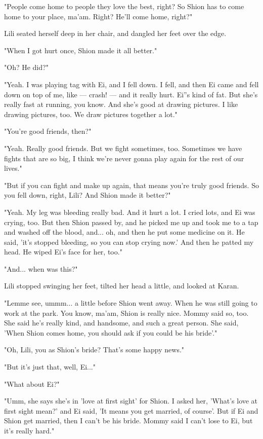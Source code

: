 "People come home to people they love the best, right? So Shion has to
come home to your place, ma'am. Right? He'll come home, right?"

Lili seated herself deep in her chair, and dangled her feet over the
edge.

"When I got hurt once, Shion made it all better."

"Oh? He did?"

"Yeah. I was playing tag with Ei, and I fell down. I fell, and then Ei
came and fell down on top of me, like --- crash! --- and it really hurt.
Ei''s kind of fat. But she's really fast at running, you know. And she's
good at drawing pictures. I like drawing pictures, too. We draw pictures
together a lot."

"You're good friends, then?"

"Yeah. Really good friends. But we fight sometimes, too. Sometimes we
have fights that are so big, I think we're never gonna play again for
the rest of our lives."

"But if you can fight and make up again, that means you're truly good
friends. So you fell down, right, Lili? And Shion made it better?"

"Yeah. My leg was bleeding really bad. And it hurt a lot. I cried lots,
and Ei was crying, too. But then Shion passed by, and he picked me up
and took me to a tap and washed off the blood, and... oh, and then he
put some medicine on it. He said, 'it's stopped bleeding, so you can
stop crying now.' And then he patted my head. He wiped Ei's face for
her, too."

"And... when was this?"

Lili stopped swinging her feet, tilted her head a little, and looked at
Karan.

"Lemme see, ummm... a little before Shion went away. When he was still
going to work at the park. You know, ma'am, Shion is really nice. Mommy
said so, too. She said he's really kind, and handsome, and such a great
person. She said, 'When Shion comes home, you should ask if you could be
his bride'."

"Oh, Lili, you as Shion's bride? That's some happy news."

"But it's just that, well, Ei..."

"What about Ei?"

"Umm, she says she's in 'love at first sight' for Shion. I asked her,
'What's love at first sight mean?' and Ei said, 'It means you get
married, of course'. But if Ei and Shion get married, then I can't be
his bride. Mommy said I can't lose to Ei, but it's really hard."


